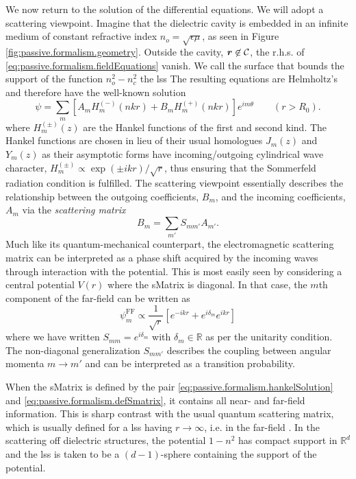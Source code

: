 We now return to the solution of the differential equations. 
We will adopt a scattering viewpoint. 
Imagine that the dielectric cavity is embedded in an infinite
medium of constant refractive index  $n_o=\sqrt{\epsilon\mu}$, 
as seen in Figure \ref{fig:passive.formalism.geometry}. 
Outside the cavity, $\boldsymbol{r}\not\in{\mathcal{C}}$, 
the r.h.s. of \eqref{eq:passive.formalism.fieldEquations} vanish. 
We call the surface that bounds the support of the function 
$n_o^2-n_c^2$ the \gls{lss}
The resulting equations are Helmholtz's and therefore have the well-known solution
  \begin{equation}
    \label{eq:passive.formalism.hankelSolution}
    \psi = \sum_{m} \left[A_m H_m^{(-)}(nkr) + B_m H_m^{(+)}(nkr)\right]e^{im\theta} \qquad (r>R_0).
  \end{equation}
where $H_m^{(\pm)}(z)$ are the Hankel functions of the first
and second kind. The Hankel functions are chosen in lieu of their
usual homologues $J_m(z)$ and $Y_m(z)$ as their asymptotic forms 
have incoming/outgoing cylindrical wave character, 
$H_m^{(\pm)}\propto \exp(\pm ikr)/\sqrt{r}$, thus ensuring that
the Sommerfeld radiation condition is fulfilled. The scattering
viewpoint essentially describes the relationship between the 
outgoing coefficients, $B_m$, and the incoming coefficients, $A_m$
via the \textit{scattering matrix}
  \begin{equation}
  	\label{eq:passive.formalism.defSmatrix}
    B_m = \sum_{m'}S_{mm'}A_{m'}. 
  \end{equation}
Much like its quantum-mechanical counterpart, the electromagnetic scattering
matrix can be interpreted as a phase shift acquired by the incoming
waves through interaction with the potential. This is most easily seen
by considering a central potential $V(r)$ where the \gls{sMatrix}
is diagonal. In that case, the $m$th component of the far-field can
be written as
  \begin{equation}
   \label{eq:passive.formalism.centralPotentialField}
   \psi_m^\text{FF} \propto \frac{1}{\sqrt{r}}\left[e^{-ikr}+e^{i\delta_m}e^{ikr}\right]
  \end{equation}
where we have written $S_{mm}=e^{i\delta_m}$ with $\delta_m\in\mathbb{R}$ 
as per the unitarity condition. The non-diagonal
generalization $S_{mm'}$ describes the coupling between angular
momenta $m\rightarrow m'$ and can be interpreted as a transition
probability.

When the \gls{sMatrix} is defined by the pair \eqref{eq:passive.formalism.hankelSolution}
and \eqref{eq:passive.formalism.defSmatrix}, it contains all near- and
far-field information. This is sharp contrast with the usual quantum 
scattering matrix, which is usually defined for a \gls{lss} having 
$r\rightarrow\infty$, i.e. in the far-field \cite{NEW1982}. In the scattering off dielectric structures, the potential 
$1-n^2$ has compact support in $\mathbb{R}^d$ and the \gls{lss} is taken to be 
a $(d-1)$-sphere containing the support of the potential.

